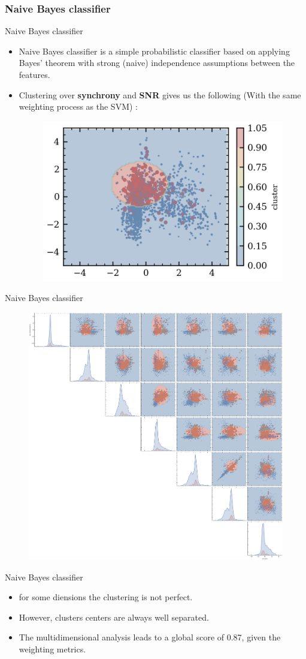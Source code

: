 \documentclass[numbering=fraction]{beamer}
\begin{document}
\subsubsection{Naive Bayes classifier}
\begin{frame}{Naive Bayes classifier}
    \begin{itemize}
        \item Naive Bayes classifier is a simple probabilistic classifier based on applying Bayes' theorem with strong (naive) independence assumptions between the features.
        \item Clustering over \textbf{synchrony} and \textbf{SNR} gives us the following (With the same weighting process as the SVM) :
              \begin{figure}[H]
                  \centering
                  \includegraphics[width=0.6\linewidth]{figure/cluster_GaussianNB.png}
              \end{figure}
    \end{itemize}
\end{frame}
\begin{frame}{Naive Bayes classifier}
    \begin{figure}[H]
        \centering
        \includegraphics[height=0.6\linewidth]{./figure/Gaussianb_pair.png}
    \end{figure}
\end{frame}
\begin{frame}{Naive Bayes classifier}
    \begin{itemize}
        \item for some diensions the clustering is not perfect.
        \item However, clusters centers are always well separated.
        \item The multidimensional analysis leads to a global score of 0.87, given the weighting metrics.
    \end{itemize}

\end{frame}
\end{document}
